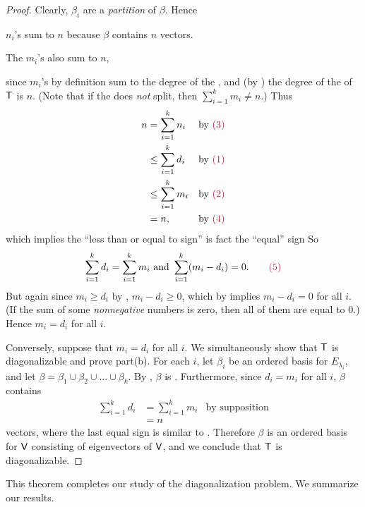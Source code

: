 \begin{proof}
Clearly, \(\beta_i\) are a \emph{partition} of \(\beta\).
Hence
\begin{center}
    \(n_i\)'s sum to \(n\) because \(\beta\) contains \(n\) vectors. \quad \quad {}
\end{center}
\begin{center}
    The \(m_i\)'s also sum to \(n\), \quad \quad {}
\end{center}
since \(m_i\)'s by definition sum to the degree of the  \CPOLY{}, and (by ) the degree of the \CPOLY{} of \(\textsf{T}\) is \(n\).
(Note that if the \CPOLY{} does \emph{not} split, then \(\sum_{i = 1}^k m_i \ne n\).)
Thus
\begin{align*}
    n & = \sum_{i = 1}^k n_i & \text{by \MAROON{(3)}} \\
      & \le \sum_{i = 1}^k d_i & \text{by \MAROON{(1)}} \\
      & \le \sum_{i = 1}^k m_i & \text{by \MAROON{(2)}} \\
      & = n, & \text{by \MAROON{(4)}}
\end{align*}
which implies the ``less than or equal to sign'' is fact the ``equal'' sign
So
\[
    \sum_{i = 1}^k d_i = \sum_{i = 1}^k m_i \text{ and } \sum_{i = 1}^k (m_i - d_i) = 0. \quad \quad \MAROON{(5)}
\]
But again since \(m_i \ge d_i\) by , \(m_i - d_i \ge 0\), which by  implies \(m_i - d_i = 0\) for all \(i\).
(If the sum of some \emph{nonnegative} numbers is zero, then all of them are equal to \(0\).)
Hence \(m_i = d_i\) for all \(i\).

Conversely, suppose that \(m_i = d_i\) for all \(i\).
We simultaneously show that \(\textsf{T}\) is diagonalizable and prove part(b).
For each \(i\), let \(\beta_i\) be an ordered basis for \(E_{\lambda_i}\), and let \(\beta = \beta_1 \cup \beta_2 \cup ... \cup \beta_k\).
By , \(\beta\) is \LID{}.
Furthermore, since \(d_i = m_i\) for all \(i\), \(\beta\) contains
\begin{align*}
    \sum_{i = 1}^k d_i & = \sum_{i = 1}^k m_i & \text{by supposition} \\
        & = n
\end{align*}
vectors, where the last equal sign is similar to .
Therefore \(\beta\) is an ordered basis for \(\textsf{V}\) consisting of eigenvectors of \(\textsf{V}\), and we conclude that \(\textsf{T}\) is diagonalizable.
\end{proof}

This theorem completes our study of the diagonalization problem.
We summarize our results.

